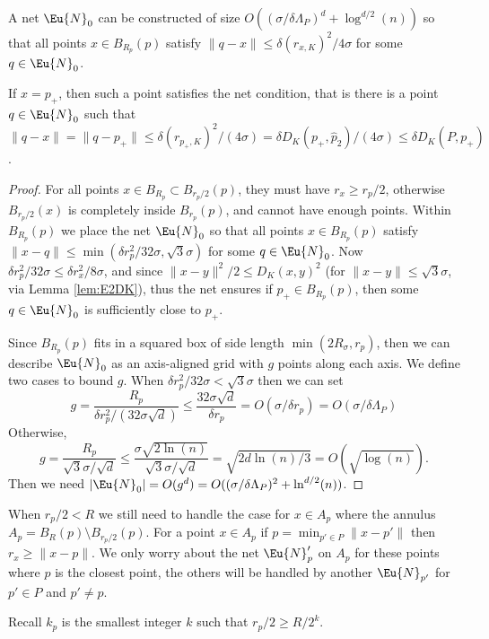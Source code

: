 \documentclass[11pt]{myclass}
\begin{document}
\begin{lemma}
\label{lem:N0}
A net $\Eu{N}_0$ can be constructed of size $O((\sigma/ \delta \Lambda_P)^d + \log^{d/2}(n))$ so that all points $x \in B_{R_p}(p)$ satisfy $\|q - x\| \leq \delta (r_{x,K})^2/4 \sigma$ for some $q \in \Eu{N}_0$.
\end{lemma}
If $x = p_+$, then such a point satisfies the net condition, that is there is a point $q \in \Eu{N}_0$ such that   
$\|q - x\| = \| q - p_+\| \leq \delta (r_{p_+,K})^2/(4 \sigma) = \delta D_K(p_+,\hat p_2)/(4\sigma) \leq \delta D_K(P, p_+)$.  
\begin{proof}
For all points $x \in B_{R_p} \subset B_{r_p/2}(p)$, they must have $r_x \geq r_p/2$, otherwise $B_{r_p/2}(x)$ is completely inside $B_{r_p}(p)$, and cannot have enough points.   
Within $B_{R_p}(p)$ we place the net $\Eu{N}_0$ so that all points $x \in B_{R_p}(p)$ satisfy $\|x-q\| \leq \min(\delta r_p^2/32\sigma, \sqrt{3}\sigma)$ for some $q \in \Eu{N}_0$.  
Now $\delta r_p^2/32 \sigma \leq \delta r_x^2 / 8 \sigma$, and since $\|x-y\|^2/2 \leq D_K(x,y)^2$ (for $\|x-y\| \leq \sqrt{3}\sigma$, via Lemma \ref{lem:E2DK}), thus the net ensures if $p_+ \in B_{R_p}(p)$, then some $q \in \Eu{N}_0$ is sufficiently close to $p_+$.  

Since $B_{R_p}(p)$ fits in a squared box of side length $\min(2 R_\sigma,r_p)$, then we can describe $\Eu{N}_0$ as an axis-aligned grid with $g$ points along each axis.  We define two cases to bound $g$.  When $\delta r_p^2/32 \sigma < \sqrt{3} \sigma$ then we can set
\[
g 
= 
\frac{R_p}{\delta r_p^2/ (32\sigma\sqrt{d}) } 
\leq 
\frac{32 \sigma \sqrt{d} }{\delta r_p} 
= 
O(\sigma/\delta r_p) = O(\sigma / \delta \Lambda_P)
\]
Otherwise, 
\[
g = 
\frac{R_p}{\sqrt{3} \sigma/\sqrt{d}}
\leq
\frac{\sigma \sqrt{2\ln(n)}}{\sqrt{3} \sigma/\sqrt{d}}
=
\sqrt{2d \ln(n)/3} = O(\sqrt{\log(n)}).
\]
Then we need $|\Eu{N}_0| = O(g^d) = O((\sigma / \delta \Lambda_P)^2 + \ln^{d/2}(n))$.  
\end{proof}

When $r_p/2 < R$ we still need to handle the case for $x \in A_p$ where the annulus $A_p = B_R(p) \setminus B_{r_p/2}(p)$.  
For a point $x \in A_p$ if $p = \min_{p' \in P} \|x-p'\|$ then $r_x \geq \|x-p\|$.  We only worry about the net $\Eu{N}_p'$ on $A_p$ for these points where $p$ is the closest point, the others will be handled by another $\Eu{N}_{p'}$ for $p' \in P$ and $p' \neq p$.  

Recall $k_p$ is the smallest integer $k$ such that $r_p/2 \geq R/2^k$.  
\end{document}
